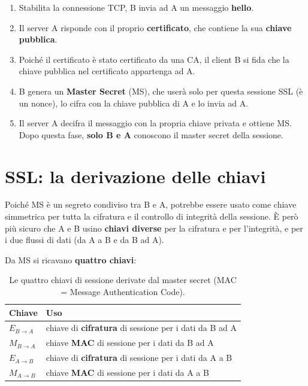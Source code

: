\begin{enumerate}
    \item Stabilita la connessione TCP, B invia ad A un messaggio \textbf{hello}.
    \item Il server A risponde con il proprio \textbf{certificato}, che contiene la sua \textbf{chiave pubblica}.
    \item Poiché il certificato è stato certificato da una CA, il client B si fida che la chiave pubblica nel certificato appartenga ad A.
    \item B genera un \textbf{Master Secret} (MS), che userà solo per questa sessione SSL (è un nonce), lo cifra con la chiave pubblica di A e lo invia ad A.
    \item Il server A decifra il messaggio con la propria chiave privata e ottiene MS. Dopo questa fase, \textbf{solo B e A} conoscono il master secret della sessione.
\end{enumerate}


\section{SSL: la derivazione delle chiavi}

Poiché MS è un segreto condiviso tra B e A, potrebbe essere usato come chiave simmetrica per tutta la cifratura e il controllo di integrità della
sessione. È però più sicuro che A e B usino \textbf{chiavi diverse} per la cifratura e per l'integrità, e per i due flussi di dati (da A a B e da B ad A).

Da MS si ricavano \textbf{quattro chiavi}:

\begin{table}[H]
\centering
\begin{tabular}{ll}
\toprule
\textbf{Chiave} & \textbf{Uso} \\
\midrule
$E_{B\rightarrow A}$ & chiave di \textbf{cifratura} di sessione per i dati da B ad A \\
$M_{B\rightarrow A}$ & chiave \textbf{MAC} di sessione per i dati da B ad A \\
$E_{A\rightarrow B}$ & chiave di \textbf{cifratura} di sessione per i dati da A a B \\
$M_{A\rightarrow B}$ & chiave \textbf{MAC} di sessione per i dati da A a B \\
\bottomrule
\end{tabular}
\caption{Le quattro chiavi di sessione derivate dal master secret (MAC = Message Authentication Code).}
\end{table}

